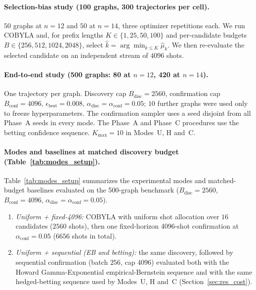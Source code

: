 \documentclass[a4paper,onecolumn,unpublished]{quantumarticle}
\newcommand{\Bdisc}{B_{\mathrm{disc}}}
\newcommand{\Bconf}{B_{\mathrm{conf}}}
\newcommand{\adisc}{\alpha_{\mathrm{disc}}}
\newcommand{\aconf}{\alpha_{\mathrm{conf}}}
\newcommand{\epsbest}{\epsilon_{\mathrm{best}}}
\newcommand{\Kmax}{K_{\max}}
\begin{document}
\paragraph*{Selection-bias study (100 graphs, 300 trajectories per cell).}
$50$ graphs at $n = 12$ and $50$ at $n = 14$, three optimizer repetitions each. We run COBYLA and, for prefix lengths $K \in \{1, 25, 50, 100\}$ and per-candidate budgets $B \in \{256, 512, 1024, 2048\}$, select $\hat k = \arg\min_{k\le K} \widehat\mu_k$. We then re-evaluate the selected candidate on an independent stream of $4096$ shots.

\paragraph*{End-to-end study (500 graphs: 80 at $n = 12$, 420 at $n = 14$).}
One trajectory per graph. Discovery cap $\Bdisc = 2560$, confirmation cap $\Bconf = 4096$, $\epsbest = 0.008$, $\adisc = \aconf = 0.05$; $10$ further graphs were used only to freeze hyperparameters. The confirmation sampler uses a seed disjoint from all Phase~A seeds in every mode. The Phase~A and Phase~C procedures use the betting confidence sequence. $\Kmax = 10$ in Modes~U, H and~C.

\paragraph*{Modes and baselines at matched discovery budget (Table~\ref{tab:modes_setup}).}
Table~\ref{tab:modes_setup} summarizes the experimental modes and matched-budget baselines evaluated on the 500-graph benchmark ($\Bdisc = 2560$, $\Bconf = 4096$, $\adisc = \aconf = 0.05$).
\begin{enumerate}
  \item \emph{Uniform + fixed-4096:} COBYLA with uniform shot allocation over $16$ candidates ($2560$ shots), then one fixed-horizon 4096-shot confirmation at $\aconf = 0.05$ ($6656$ shots in total).
  \item \emph{Uniform + sequential (EB and betting):} the same discovery, followed by sequential confirmation (batch $256$, cap $4096$) evaluated both with the Howard Gamma-Exponential empirical-Bernstein sequence and with the same hedged-betting sequence used by Modes~U, H and~C (Section~\ref{sec:res_cost}).
\end{enumerate}
\end{document}
